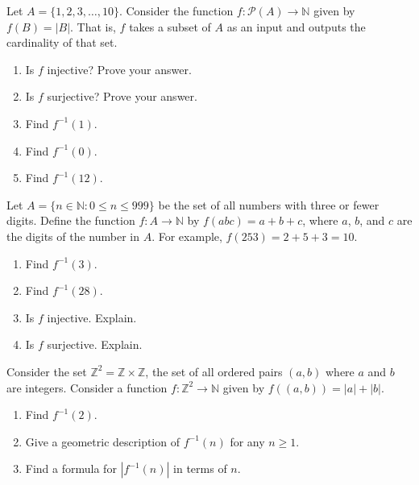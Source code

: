 \documentclass[10pt,]{book}
\theoremstyle{plain}
\theoremstyle{definition}
\theoremstyle{definition}
\theoremstyle{definition}
\theoremstyle{definition}
\numberwithin{equation}{chapter}
\def\N{\mathbb N}
\def\Z{\mathbb Z}
\def\pow{\mathcal P}
\def\inv{^{-1}}
\def\st{:}
\begin{document}
\begin{divisionexercise}{6}\hypertarget{exercise-208}{}
\hypertarget{p-1810}{}%
Let \(A = \{1,2,3,\ldots,10\}\). Consider the function \(f:\pow(A) \to \N\) given by \(f(B) = |B|\). That is, \(f\) takes a subset of \(A\) as an input and outputs the cardinality of that set. \leavevmode%
\begin{enumerate}[label=(\alph*)]
\item\hypertarget{li-581}{}\hypertarget{p-1811}{}%
Is \(f\) injective? Prove your answer.%
\item\hypertarget{li-582}{}\hypertarget{p-1812}{}%
Is \(f\) surjective? Prove your answer.%
\item\hypertarget{li-583}{}\hypertarget{p-1813}{}%
Find \(f\inv(1)\).%
\item\hypertarget{li-584}{}\hypertarget{p-1814}{}%
Find \(f\inv(0)\).%
\item\hypertarget{li-585}{}\hypertarget{p-1815}{}%
Find \(f\inv(12)\).%
\end{enumerate}
%
\end{divisionexercise}%
\begin{divisionexercise}{7}\hypertarget{exercise-209}{}
\hypertarget{p-1822}{}%
Let \(A = \{n \in \N \st 0 \le n \le 999\}\) be the set of all numbers with three or fewer digits. Define the function \(f:A \to \N\) by \(f(abc) = a+b+c\), where \(a\), \(b\), and \(c\) are the digits of the number in \(A\). For example, \(f(253) = 2 + 5 + 3 =  10\). \leavevmode%
\begin{enumerate}[label=(\alph*)]
\item\hypertarget{li-591}{}\hypertarget{p-1823}{}%
Find \(f\inv(3)\).%
\item\hypertarget{li-592}{}\hypertarget{p-1824}{}%
Find \(f\inv(28)\).%
\item\hypertarget{li-593}{}\hypertarget{p-1825}{}%
Is \(f\) injective. Explain.%
\item\hypertarget{li-594}{}\hypertarget{p-1826}{}%
Is \(f\) surjective. Explain.%
\end{enumerate}
%
\end{divisionexercise}%
\begin{divisionexercise}{8}\hypertarget{exercise-210}{}
\hypertarget{p-1830}{}%
Consider the set \(\Z^2 = \Z \times \Z\), the set of all ordered pairs \((a,b)\) where \(a\) and \(b\) are integers.  Consider a function \(f: \Z^2 \to \N\) given by \(f((a,b)) = |a| + |b|\). \leavevmode%
\begin{enumerate}[label=(\alph*)]
\item\hypertarget{li-599}{}\hypertarget{p-1831}{}%
Find \(f\inv(2)\).%
\item\hypertarget{li-600}{}\hypertarget{p-1832}{}%
Give a geometric description of \(f\inv(n)\) for any \(n \ge 1\).%
\item\hypertarget{li-601}{}\hypertarget{p-1833}{}%
Find a formula for \(|f\inv(n)|\) in terms of \(n\).%
\end{enumerate}
%
\end{divisionexercise}%
\end{document}
